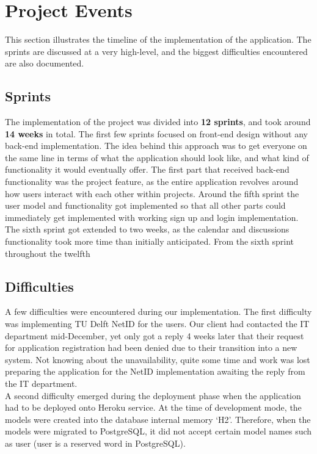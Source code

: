 \section{Project Events}

This section illustrates the timeline of the implementation of the application. The sprints are discussed at a very high-level, and
the biggest difficulties encountered are also documented.

\subsection{Sprints}

The implementation of the project was divided into \textbf{12 sprints}, and took around \textbf{14 weeks} in total. 
The first few sprints focused on front-end design without any back-end implementation. The idea
behind this approach was to get everyone on the same line in terms of what the application should look like, and
what kind of functionality it would eventually offer. 
The first part that received back-end functionality was the project feature, as the entire application
revolves around how users interact with each other within projects.
Around the fifth sprint the user model and functionality got implemented so that all other parts could immediately
get implemented with working sign up and login implementation.
The sixth sprint got extended to two weeks, as the calendar and discussions functionality took more time than initially
anticipated. From the sixth sprint throughout the twelfth
\newpage
\subsection{Difficulties}

A few difficulties were encountered during our implementation. The first difficulty was implementing TU Delft
NetID for the users. Our client had contacted the IT department mid-December, yet only got a reply 4 weeks later
that their request for application registration had been denied due to their transition into a new system. Not
knowing about the unavailability, quite some time and work was lost preparing the application for the NetID implementation
awaiting the reply from the IT department.\\

A second difficulty emerged during the deployment phase when the application had to be deployed onto Heroku service. At the time of development mode, the models were created into the database internal memory `H2'. Therefore, when the models were migrated to PostgreSQL, it did not accept certain model names such as user (user is a reserved word in PostgreSQL).